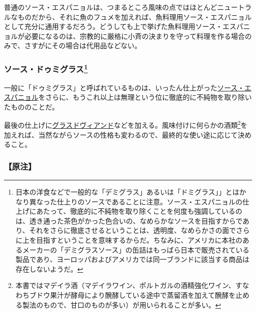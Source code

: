 \begin{recette}
普通のソース・エスパニョルは、つまるところ風味の点ではほとんどニュートラルなものだから、それに魚のフュメを加えれば、魚料理用ソース・エスパニョルとして充分に通用するだろう。どうしても上で挙げた魚料理用ソース・エスパニョルが必要になるのは、宗教的に厳格に小斉の決まりを守って料理を作る場合のみで、さすがにその場合は代用品などない。

\atoaki{}

\hypertarget{sauce-demi-glace}{%
\subsubsection[ソース・ドゥミグラス]{\texorpdfstring{ソース・ドゥミグラス\footnote{日本の洋食などで一般的な「デミグラス」あるいは「ドミグラス」」とはかなり異なった仕上りのソースであることに注意。ソース・エスパニョルの仕上げにあたって、徹底的に不純物を取り除くことを何度も強調しているのは、透き通った茶色がかった色合いの、なめらかなソースを目指すからであり、それをさらに徹底させるということは、透明度、なめらかさの面でさらに上を目指すということを意味するからだ。ちなみに、アメリカに本社のあるメーカーの「デミグラスソース」の缶詰はもっぱら日本で販売されている製品であり、ヨーロッパおよびアメリカでは同一ブランドに該当する商品は存在しないようだ。}}{ソース・ドゥミグラス}}\label{sauce-demi-glace}}



一般に「ドゥミグラス」と呼ばれているものは、いったん仕上がった\protect\hyperlink{sauce-espagnole}{ソース・エスパニョル}をさらに、もうこれ以上は無理という位に徹底的に不純物を取り除いたもののことだ。

最後の仕上げに\protect\hyperlink{glace-de-viande}{グラスドヴィアンド}などを加える。風味付けに何らかの酒類\footnote{本書ではマデイラ酒（マデイラワイン、ポルトガルの酒精強化ワイン、すなわちブドウ果汁が酵母により醗酵している途中で蒸留酒を加えて醗酵を止める製法のもので、甘口のものが多い）が用いられることが多い。}を加えれば、当然ながらソースの性格も変わるので、最終的な使い途に応じて決めること。

\hypertarget{nota-sauce-demi-glace}{%
\subsubsection{【原注】}\label{nota-sauce-demi-glace}}


\end{recette}
